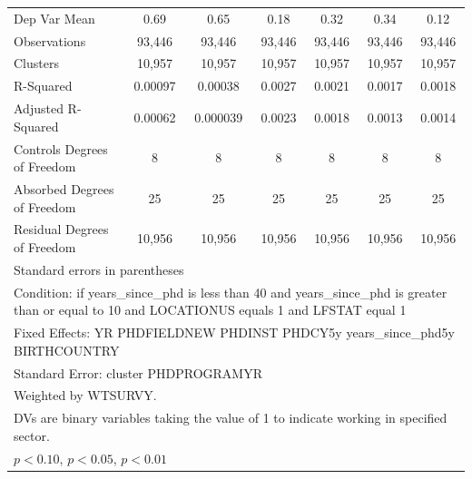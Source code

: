 \begin{table}[htbp]
\begin{tabular}{l*{6}{c}}
\hline
Dep Var Mean&        0.69         &        0.65         &        0.18         &        0.32         &        0.34         &        0.12         \\
Observations&      93,446         &      93,446         &      93,446         &      93,446         &      93,446         &      93,446         \\
Clusters&      10,957         &      10,957         &      10,957         &      10,957         &      10,957         &      10,957         \\
R-Squared&     0.00097         &     0.00038         &      0.0027         &      0.0021         &      0.0017         &      0.0018         \\
Adjusted R-Squared&     0.00062         &    0.000039         &      0.0023         &      0.0018         &      0.0013         &      0.0014         \\
Controls Degrees of Freedom&           8         &           8         &           8         &           8         &           8         &           8         \\
Absorbed Degrees of Freedom&          25         &          25         &          25         &          25         &          25         &          25         \\
Residual Degrees of Freedom&      10,956         &      10,956         &      10,956         &      10,956         &      10,956         &      10,956         \\
\hline\hline
\multicolumn{7}{l}{\footnotesize Standard errors in parentheses}\\
\multicolumn{7}{l}{\footnotesize Condition: if years\_since\_phd is less than 40 and years\_since\_phd is greater than or equal to 10 and LOCATIONUS equals 1 and LFSTAT equal 1}\\
\multicolumn{7}{l}{\footnotesize Fixed Effects: YR PHDFIELDNEW PHDINST PHDCY5y years\_since\_phd5y BIRTHCOUNTRY}\\
\multicolumn{7}{l}{\footnotesize Standard Error: cluster PHDPROGRAMYR}\\
\multicolumn{7}{l}{\footnotesize Weighted by WTSURVY.}\\
\multicolumn{7}{l}{\footnotesize DVs are binary variables taking the value of 1 to indicate working in specified sector.}\\
\multicolumn{7}{l}{\footnotesize \sym{*} \(p<0.10\), \sym{**} \(p<0.05\), \sym{***} \(p<0.01\)}\\
\end{tabular}
\end{table}
